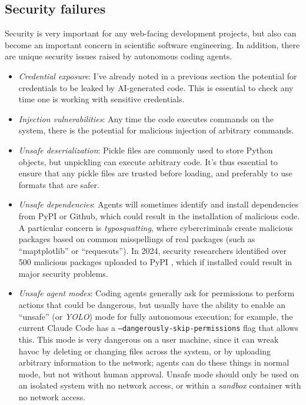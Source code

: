 \subsection{Security failures}

Security is very important for any web-facing development projects, but also can become an important concern in scientific software engineering.  In addition, there are unique security issues raised by autonomous coding agents.

\begin{itemize}
\item \textit{Credential exposure}: I've already noted in a previous section the potential for credentials to be leaked by AI-generated code.  This is essential to check any time one is working with sensitive credentials.
\item \textit{Injection vulnerabilities}: Any time the code executes commands on the system, there is the potential for malicious injection of arbitrary commands.
\item \textit{Unsafe deserialization}: Pickle files are commonly used to store Python objects, but unpickling can execute arbitrary code.  It's thus essential to ensure that any pickle files are trusted before loading, and preferably to use formats that are safer.
\item \textit{Unsafe dependencies}: Agents will sometimes identify and install dependencies from PyPI or Github, which could result in the installation of malicious code.  A particular concern is \textit{typosquatting}, where cybercriminals create malicious packages based on common misspellings of real packages (such as ``maptplotlib'' or ``requesuts''). In 2024, security researchers identified over 500 malicious packages uploaded to PyPI \citep{Abramovsky:2024aa}, which if installed could result in major security problems.
\item \textit{Unsafe agent modes}: Coding agents generally ask for permissions to perform actions that could be dangerous, but usually have the ability to enable an ``unsafe'' (or \textit{YOLO}) mode for fully autonomous execution; for example, the current Claude Code has a \texttt{--dangerously-skip-permissions} flag that allows this.  This mode is very dangerous on a user machine, since it can wreak havoc by deleting or changing files across the system, or by uploading arbitrary information to the network; agents can do these things in normal mode, but not without human approval. Unsafe mode should only be used on an isolated system with no network access, or within a \textit{sandbox} container with no network access.
\end{itemize}

